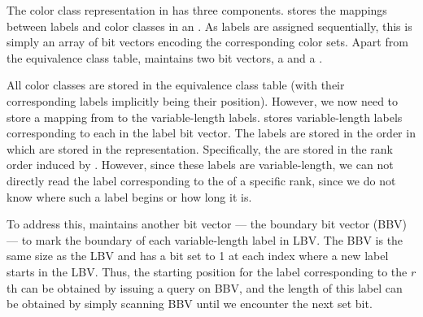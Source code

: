 
The color class representation in \rainbowfish has three components. \rainbowfish stores
the mappings between labels and color classes in an . As labels are assigned sequentially, this is simply an array of
bit vectors encoding the corresponding color sets. Apart from the equivalence
class table, \rainbowfish maintains two bit vectors, a  and a .

All color classes are stored in the equivalence class table (with their
corresponding labels implicitly being their position). However, we now need to
store a mapping from \kmers to the variable-length labels. \rainbowfish stores
variable-length labels corresponding to each \kmer in the label bit vector. The
labels are stored in the order in which \kmers are stored in the \dbg
representation. Specifically, the \kmers are stored in the rank order induced by
\boss. However, since these labels are variable-length, we can not directly read
the label corresponding to the \kmer of a specific rank, since we do not know
where such a label begins or how long it is.

To address this, \rainbowfish maintains another bit vector --- the boundary bit
vector (BBV) --- to mark the boundary of each variable-length label in LBV. The
BBV is the same size as the LBV and has a bit set
to 1 at each index where a new label starts in the LBV. Thus, the starting
position for the label corresponding to the $r$th \kmer can be obtained by
issuing a  query on BBV, and the length of this label can be
obtained by simply scanning BBV until we encounter the next set bit.


